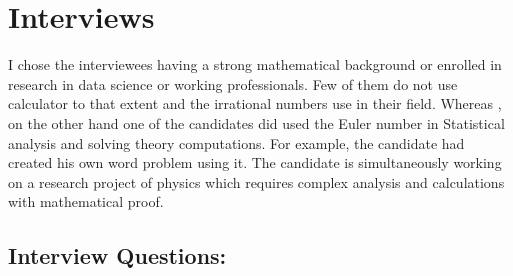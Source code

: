 \documentclass[12pt]{report}
\begin{document}
\vspace{\baselineskip}

\vspace{\baselineskip}

\vspace{\baselineskip}

\vspace{\baselineskip}

\vspace{\baselineskip}
\section*{Interviews}

\vspace{\baselineskip}
\begin{justify}
I chose the interviewees having a strong mathematical background or enrolled in research in data science or working professionals. Few of them do not use calculator to that extent and the irrational numbers use in their field. Whereas , on the other hand one of the candidates did used the Euler number in Statistical analysis and solving theory computations. For example, the candidate had created his own word problem using it. The candidate is simultaneously working on a research project of physics which requires complex analysis and calculations with mathematical proof. 
\end{justify}\par


\vspace{\baselineskip}
\subsection*{Interview Questions:}
\end{document}
